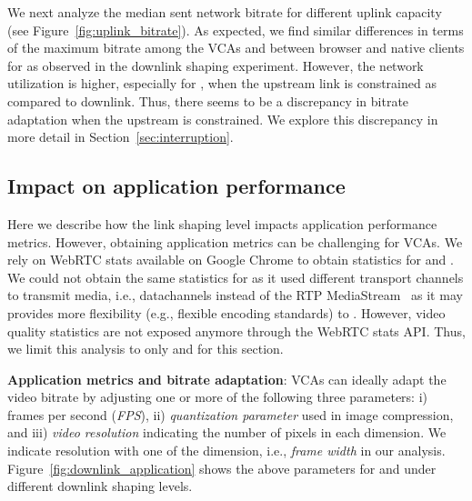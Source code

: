 We next analyze the median sent network bitrate for different uplink capacity (see Figure~\ref{fig:uplink_bitrate}). As expected, we find similar differences in terms of the maximum bitrate among the VCAs and between browser and native clients for \teams as observed in the downlink shaping experiment. However, the network utilization is higher, especially for \meet, when the upstream link is constrained as compared to downlink. Thus, there seems to be a discrepancy in bitrate adaptation when the upstream is constrained. We explore this discrepancy in more detail in Section~\ref{sec:interruption}. 

\subsection{Impact on application performance}
Here we describe how the link shaping level impacts application performance metrics. However, obtaining application metrics can be challenging for VCAs. We rely on WebRTC stats available on Google Chrome to obtain statistics for \teamsbrowser and \meet. We could not obtain the same statistics for \zoombrowser as it used different transport channels to transmit media, i.e., datachannels instead of the RTP MediaStream~\cite{webrtc_stats} as it may provides more flexibility (e.g., flexible encoding standards) to \zoom. However, video quality statistics are not exposed anymore through the WebRTC stats API. %
Thus, we limit this analysis to only \meet and \teamsbrowser for this section. 






\textbf{Application metrics and bitrate adaptation}: VCAs can ideally adapt the video bitrate by adjusting one or more of the following three parameters: i) frames per second (\textit{FPS}), ii) \textit{quantization parameter} used in image compression, and  iii) \textit{video resolution} indicating the number of pixels in each dimension. We indicate resolution with one of the dimension, i.e., \textit{frame width} in our analysis. Figure~\ref{fig:downlink_application} shows the above parameters for \meet and \teamsbrowser under different downlink shaping levels. 




